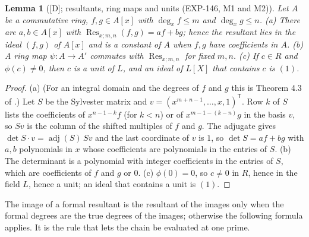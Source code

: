 \documentclass[11pt]{article}
\newtheorem{lemma}[theorem]{Lemma}
\theoremstyle{remark}
\begin{document}
\begin{lemma}[{[D]}; resultants, ring maps and units (EXP-146, M1 and M2)]\label{lem:res}
Let $A$ be a commutative ring, $f,g\in A[x]$ with $\deg_xf\le m$ and $\deg_xg\le n$. (a) There are $a,b\in A[x]$ with $\operatorname{Res}_{x;m,n}(f,g)=af+bg$; hence the resultant lies in the ideal $(f,g)$ of $A[x]$ and is a
constant of $A$ when $f,g$ have coefficients in $A$. (b) A ring map $\psi\colon A\to A'$ commutes with $\operatorname{Res}_{x;m,n}$ for fixed $m,n$. (c) If $c\in R$ and $\phi(c)\ne0$, then $c$ is a unit of $L$, and an ideal of $L[X]$ that contains $c$ is $(1)$.
\end{lemma}
\begin{proof}
(a) (For an integral domain and the degrees of $f$ and $g$ this is Theorem 4.3 of \cite{Winkler2012}.) Let $S$ be the Sylvester matrix and $v=(x^{m+n-1},\dots,x,1)^{\mathsf T}$. Row $k$ of $S$ lists the coefficients of $x^{n-1-k}f$ (for $k<n$) or of $x^{m-1-(k-n)}g$ in the basis $v$, so $Sv$ is the column of the shifted multiples of
$f$ and $g$. The adjugate gives $\det S\cdot v=\operatorname{adj}(S)\,Sv$ and the last coordinate of $v$ is $1$, so $\det S=af+bg$ with $a,b$ polynomials in $x$ whose coefficients are polynomials in the entries of $S$. (b) The determinant is a polynomial with integer coefficients in the entries of $S$, which are coefficients of $f$ and $g$ or $0$.
(c) $\phi(0)=0$, so $c\ne0$ in $R$, hence in the field $L$, hence a unit; an ideal that contains a unit is $(1)$.
\end{proof}

The image of a formal resultant is the resultant of the images only when the formal degrees are the true degrees of the images; otherwise the following formula applies. It is the rule that lets the chain be evaluated at one prime.
\end{document}
